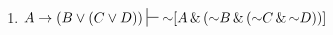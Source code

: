 \begin{enumerate}[label=(\arabic*)]
\item	$A \eif (B \eor (C \eor D))  \sststile{}{} \enot[A \eand (\enot B \eand (\enot C \eand \enot D))] $

%





\end{enumerate}


%
%

